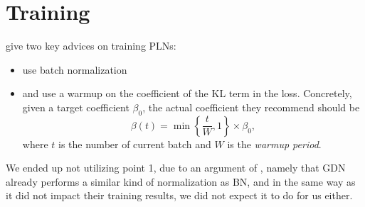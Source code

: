 \section{Training}
\par \cite{sonderby2016train} give two key advices on training PLNs:
\begin{itemize}
\item use batch normalization \cite{ioffe2015batch}
\item and use a warmup on the coefficient of the KL term in the loss.
  Concretely, given a target coefficient $\beta_0$, the actual coefficient they
  recommend should be
  \[
    \beta(t) = \min\left\{ \frac{t}{W}, 1 \right\} \times \beta_0,
  \]
  where $t$ is the number of current batch and $W$ is the \textit{warmup period}.
\end{itemize} 
We ended up not utilizing point 1, due to an argument of
\cite{balle2018variational}, namely that GDN already performs a similar kind of
normalization as BN, and in the same way as it did not impact their training
results, we did not expect it to do for us either.
